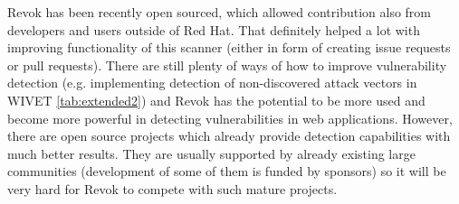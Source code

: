 	Revok has been recently open sourced, which allowed contribution also from developers and users outside of Red Hat. That definitely helped a lot with improving functionality of this scanner (either in form of creating issue requests or pull requests). There are still plenty of ways of how to improve vulnerability detection (e.g. implementing detection of non-discovered attack vectors in WIVET \ref{tab:extended2}) and Revok has the potential to be more used and become more powerful in detecting vulnerabilities in web applications. 
	However, there are open source projects which already provide detection capabilities with much better results. They are usually supported by already existing large communities (development of some of them is funded by sponsors) so it will be very hard for Revok to compete with such mature projects.

